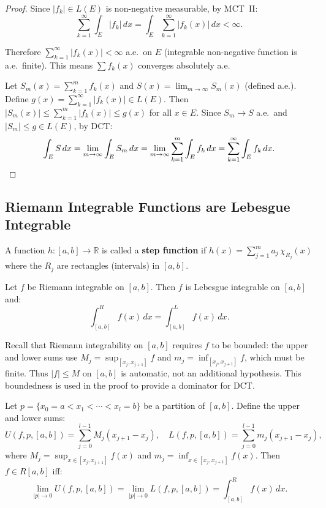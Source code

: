 \documentclass[11pt]{report}
\begin{document}
\begin{proof}
Since $|f_k| \in L(E)$ is non-negative measurable, by MCT~II:
\[
\sum_{k=1}^{\infty} \int_E |f_k|\,dx = \int_E \sum_{k=1}^{\infty} |f_k(x)|\,dx < \infty.
\]

Therefore $\sum_{k=1}^{\infty} |f_k(x)| < \infty$ a.e.\ on $E$ (integrable non-negative function is a.e.\ finite). This means $\sum f_k(x)$ converges absolutely a.e.

Let $S_m(x) = \sum_{k=1}^{m} f_k(x)$ and $S(x) = \lim_{m \to \infty} S_m(x)$ (defined a.e.). Define $g(x) = \sum_{k=1}^{\infty} |f_k(x)| \in L(E)$. Then $|S_m(x)| \leq \sum_{k=1}^{m} |f_k(x)| \leq g(x)$ for all $x \in E$. Since $S_m \to S$ a.e.\ and $|S_m| \leq g \in L(E)$, by DCT:
\[
\int_E S\,dx = \lim_{m \to \infty} \int_E S_m\,dx = \lim_{m \to \infty} \sum_{k=1}^{m} \int_E f_k\,dx = \sum_{k=1}^{\infty} \int_E f_k\,dx. \qedhere
\]
\end{proof}

\subsection{Riemann Integrable Functions are Lebesgue Integrable}

\begin{defbox}
A function $h: [a,b] \to \mathbb{R}$ is called a \textbf{step function} if $h(x) = \sum_{j=1}^{m} a_j\,\chi_{R_j}(x)$ where the $R_j$ are rectangles (intervals) in $[a,b]$.
\end{defbox}

\begin{thmbox}
Let $f$ be Riemann integrable on $[a, b]$. Then $f$ is Lebesgue integrable on $[a, b]$ and:
\[
\int_{[a,b]}^R f(x)\,dx = \int_{[a,b]}^L f(x)\,dx.
\]
\end{thmbox}

\begin{rembox}
Recall that Riemann integrability on $[a,b]$ requires $f$ to be bounded: the upper and lower sums use $M_j = \sup_{[x_j, x_{j+1}]} f$ and $m_j = \inf_{[x_j, x_{j+1}]} f$, which must be finite. Thus $|f| \leq M$ on $[a,b]$ is automatic, not an additional hypothesis. This boundedness is used in the proof to provide a dominator for DCT.
\end{rembox}

\begin{rembox}
Let $p = \{x_0 = a < x_1 < \cdots < x_l = b\}$ be a partition of $[a,b]$. Define the upper and lower sums:
\[
U(f, p, [a,b]) = \sum_{j=0}^{l-1} M_j(x_{j+1} - x_j), \quad L(f, p, [a,b]) = \sum_{j=0}^{l-1} m_j(x_{j+1} - x_j),
\]
where $M_j = \sup_{x \in [x_j, x_{j+1}]} f(x)$ and $m_j = \inf_{x \in [x_j, x_{j+1}]} f(x)$. Then $f \in R[a,b]$ iff:
\[
\lim_{|p| \to 0} U(f, p, [a,b]) = \lim_{|p| \to 0} L(f, p, [a,b]) = \int_{[a,b]}^R f(x)\,dx.
\]
\end{rembox}
\end{document}
